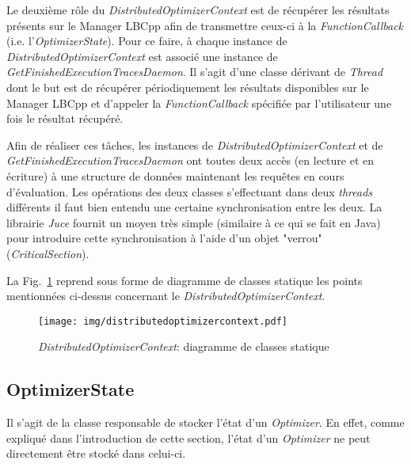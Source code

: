 \documentclass[a4paper, 11pt]{report}
\begin{document}
Le deuxième rôle du \textit{DistributedOptimizerContext} est de récupérer les résultats présents sur le Manager LBCpp afin de transmettre ceux-ci à la \textit{FunctionCallback} (i.e. l'\textit{OptimizerState}). Pour ce faire, à chaque instance de \textit{DistributedOptimizerContext} est associé une instance de \textit{GetFinishedExecutionTracesDaemon}. Il s'agit d'une classe dérivant de \textit{Thread} dont le but est de récupérer périodiquement les résultats disponibles sur le Manager LBCpp et d'appeler la \textit{FunctionCallback} spécifiée par l'utilisateur une fois le résultat récupéré.

Afin de réaliser ces tâches, les instances de \textit{DistributedOptimizerContext} et de \textit{GetFinishedExecutionTracesDaemon} ont toutes deux accès (en lecture et en écriture) à une structure de données maintenant les requêtes en cours d'évaluation. Les opérations des deux classes s'effectuant dans deux \textit{threads} différents il faut bien entendu une certaine synchronisation entre les deux. La librairie \textit{Juce} fournit un moyen très simple (similaire à ce qui se fait en Java) pour introduire cette synchronisation à l'aide d'un objet "verrou" (\textit{CriticalSection}).

La Fig.~\ref{distributedoptimizercontext} reprend sous forme de diagramme de classes statique les points mentionnées ci-dessus concernant le \textit{DistributedOptimizerContext}.

\begin{figure}[!h]
\centering
\texttt{[image: img/distributedoptimizercontext.pdf]}
\caption{\textit{DistributedOptimizerContext}: diagramme de classes statique}
\label{distributedoptimizercontext}
\end{figure}

\subsection{OptimizerState}
Il s'agit de la classe responsable de stocker l'état d'un \textit{Optimizer}. En effet, comme expliqué dans l'introduction de cette section, l'état d'un \textit{Optimizer} ne peut directement être stocké dans celui-ci. 
\end{document}

